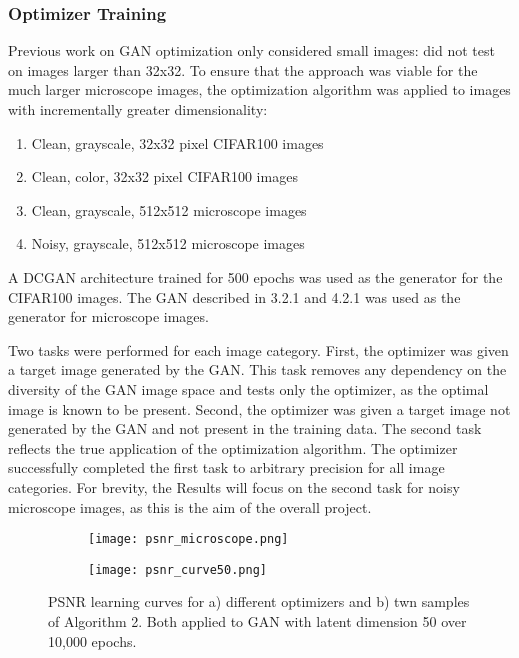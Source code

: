 \documentclass{article}
\begin{document}
\subsubsection{Optimizer Training}
Previous work on GAN optimization only considered small images: \cite{lipton17} did not test on images larger than 32x32. To ensure that the approach was viable for the much larger microscope images, the optimization algorithm was applied to images with incrementally greater dimensionality:
\begin{enumerate}
    \item Clean, grayscale, 32x32 pixel CIFAR100 images 
    \item Clean, color, 32x32 pixel CIFAR100 images 
    \item Clean, grayscale, 512x512 microscope images
    \item Noisy, grayscale, 512x512 microscope images
\end{enumerate}

A DCGAN architecture \cite{DCGAN} trained for 500 epochs was used as the generator for the CIFAR100 images. The GAN described in 3.2.1 and 4.2.1 was used as the generator for microscope images.

Two tasks were performed for each image category. First, the optimizer was given a target image generated by the GAN. This task removes any dependency on the diversity of the GAN image space and tests only the optimizer, as the optimal image is known to be present. Second, the optimizer was given a target image not generated by the GAN and not present in the training data. The second task reflects the true application of the optimization algorithm. The optimizer successfully completed the first task to arbitrary precision for all image categories. For brevity, the Results will focus on the second task for noisy microscope images, as this is the aim of the overall project.

\begin{figure}
\centering
\begin{subfigure}{.49\textwidth}
    \centering
    \texttt{[image: psnr\_microscope.png]}
\end{subfigure}
\begin{subfigure}{.49\textwidth}
    \centering
    \texttt{[image: psnr\_curve50.png]}
    
\end{subfigure}
\caption{PSNR learning curves for a) different optimizers and b) twn samples of Algorithm 2. Both applied to GAN with latent dimension 50 over 10,000 epochs.}
\label{fig:psnr_curve50}
\end{figure}
\end{document}
